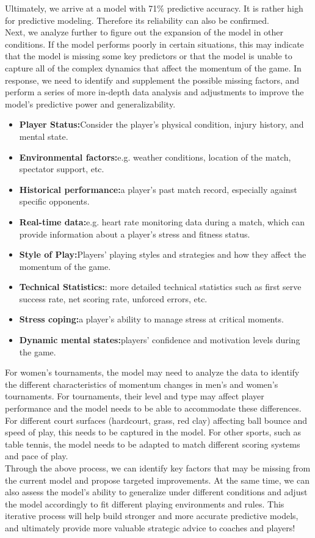 \documentclass{mcmthesis}
\begin{document}
Ultimately, we arrive at a model with 71\% predictive accuracy. It is rather high for predictive
modeling. Therefore its reliability can also be confirmed.\\
Next, we analyze further to figure out the expansion of the model in other conditions. If the
model performs poorly in certain situations, this may indicate that the model is missing some key
predictors or that the model is unable to capture all of the complex dynamics that affect the
momentum of the game. In response, we need to identify and supplement the possible missing
factors, and perform a series of more in-depth data analysis and adjustments to improve the
model's predictive power and generalizability.\\
\begin{itemize}
    \item {\bf Player Status:}Consider the player's physical condition, injury history, and mental state.
    \item {\bf Environmental factors:}e.g. weather conditions, location of the match, spectator support, etc.
    \item {\bf Historical performance:}a player's past match record, especially against specific
    opponents.
    \item {\bf Real-time data:}e.g. heart rate monitoring data during a match, which can provide
    information about a player's stress and fitness status.
    \item {\bf Style of Play:}Players' playing styles and strategies and how they affect the momentum of
    the game.
    \item {\bf Technical Statistics:}: more detailed technical statistics such as first serve success rate, net
    scoring rate, unforced errors, etc.
    \item {\bf Stress coping:}a player's ability to manage stress at critical moments.
    \item {\bf Dynamic mental states:}players' confidence and motivation levels during the game.
\end{itemize}
For women's tournaments, the model may need to analyze the data to identify the different
characteristics of momentum changes in men's and women's tournaments. For tournaments, their
level and type may affect player performance and the model needs to be able to accommodate
these differences. For different court surfaces (hardcourt, grass, red clay) affecting ball bounce and
speed of play, this needs to be captured in the model. For other sports, such as table tennis, the
model needs to be adapted to match different scoring systems and pace of play.\\
Through the above process, we can identify key factors that may be missing from the current
model and propose targeted improvements. At the same time, we can also assess the model's
ability to generalize under different conditions and adjust the model accordingly to fit different
playing environments and rules. This iterative process will help build stronger and more accurate
predictive models, and ultimately provide more valuable strategic advice to coaches and players!\\
\end{document}
